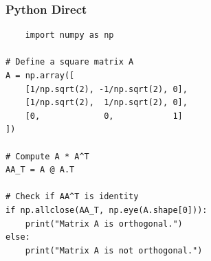 \documentclass{beamer}
\begin{document}
\begin{frame}[fragile]
\frametitle{Python Direct}
\begin{lstlisting}
    import numpy as np

# Define a square matrix A
A = np.array([
    [1/np.sqrt(2), -1/np.sqrt(2), 0],
    [1/np.sqrt(2),  1/np.sqrt(2), 0],
    [0,             0,            1]
])

# Compute A * A^T
AA_T = A @ A.T

# Check if AA^T is identity
if np.allclose(AA_T, np.eye(A.shape[0])):
    print("Matrix A is orthogonal.")
else:
    print("Matrix A is not orthogonal.")
\end{lstlisting}
\end{frame}
\end{document}
